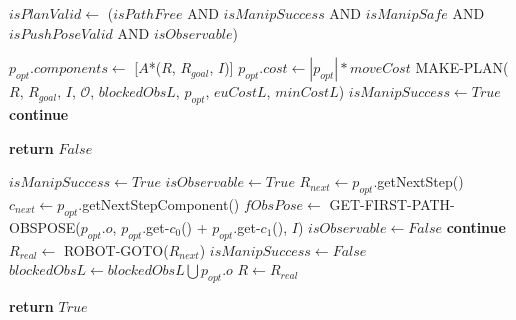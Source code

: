\begin{algorithm}[H]
\begin{algorithmic}[1]
        \State $isPlanValid \gets$ ($isPathFree$ AND $isManipSuccess$ AND $isManipSafe$ AND $isPushPoseValid$ AND $isObservable$)

          \State $p_{opt}.components \gets$ [$A$*($R$, $R_{goal}$, $I$)]
          \State $p_{opt}.cost \gets |p_{opt}| * moveCost$
        \EndIf
          \State MAKE-PLAN($R$, $R_{goal}$, $I$, $\mathcal{O}$, $blockedObsL$, $p_{opt}$, $euCostL$, $minCostL$)
          \State $isManipSuccess \gets True$
          \State \textbf{continue}
        \EndIf


  \end{algorithmic}
\end{algorithm}

\begin{algorithm}[H]

  \label{alg:07-custom-merge-makeandexecuteplan-part2}

  \begin{algorithmic}[1]


          \State \textbf{return} $False$
        \EndIf

        \State $isManipSuccess \gets True$
        \State $isObservable \gets True$
        \State $R_{next} \gets p_{opt}$.getNextStep()
        \State $c_{next} \gets p_{opt}$.getNextStepComponent()
          \State $fObsPose \gets$ GET-FIRST-PATH-OBSPOSE($p_{opt}.o$, $p_{opt}$.get-$c_{0}$() + $p_{opt}$.get-$c_{1}$(), $I$)
            \State $isObservable \gets False$
            \State \textbf{continue}
          \EndIf
        \EndIf
        \State $R_{real} \gets$ ROBOT-GOTO($R_{next}$)
          \State $isManipSuccess \gets False$
          \State $blockedObsL \gets blockedObsL \bigcup p_{opt}.o$
        \EndIf
        \State $R \gets R_{real}$

      \EndWhile

      \State \textbf{return} $True$

    \EndProcedure

  \end{algorithmic}
\end{algorithm}
